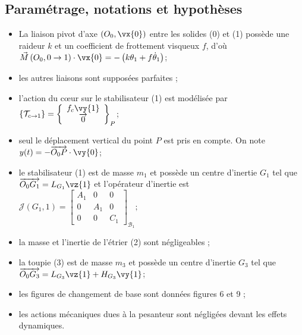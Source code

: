 \subsection*{Paramétrage, notations et hypothèses}
\begin{itemize}
  \item La liaison pivot d'axe $\left(O_{0}, \vx{0}\right)$ entre les solides (0) et (1) possède une raideur $k$ et un coefficient de frottement visqueux $f$, d'où $\vec{M}\left(O_{0}, 0 \rightarrow 1\right) \cdot \vx{0}=-\left(k \theta_{1}+f \dot{\theta}_{1}\right)$;

  \item les autres liaisons sont supposées parfaites ;

  \item l'action du cœur sur le stabilisateur (1) est modélisée par $\left\{\mathcal{T}_{c \rightarrow 1}\right\}=\left\{\begin{array}{c}f_{c} \vy{1} \\ \overrightarrow{0}\end{array}\right\}_{P}$;

\item seul le déplacement vertical du point $P$ est pris en compte. On note $y(t)=-\overrightarrow{O_{0} P} \cdot \vy{0}$;

\item  le stabilisateur (1) est de masse $m_{1}$ et possède un centre d'inertie $G_{1}$ tel que $\overrightarrow{O_{0} G_{1}}=L_{G_{1}} \vz{1}$ et l'opérateur d'inertie est $\mathcal{J}\left(G_{1}, 1\right)=\left[\begin{array}{ccc}A_{1} & 0 & 0 \\ 0 & A_{1} & 0 \\ 0 & 0 & C_{1}\end{array}\right]_{\mathcal{B}_{1}} ;$

  \item la masse et l'inertie de l'étrier (2) sont négligeables ;

  \item la toupie (3) est de masse $m_{3}$ et possède un centre d'inertie $G_{3}$ tel que $\overrightarrow{O_{0} G_{3}}=L_{G_{3}} \vz{1}+H_{G_{3}} \vy{1}$;

  \item les figures de changement de base sont données figures 6 et 9 ;

  \item les actions mécaniques dues à la pesanteur sont négligées devant les effets dynamiques. 

\end{itemize}
